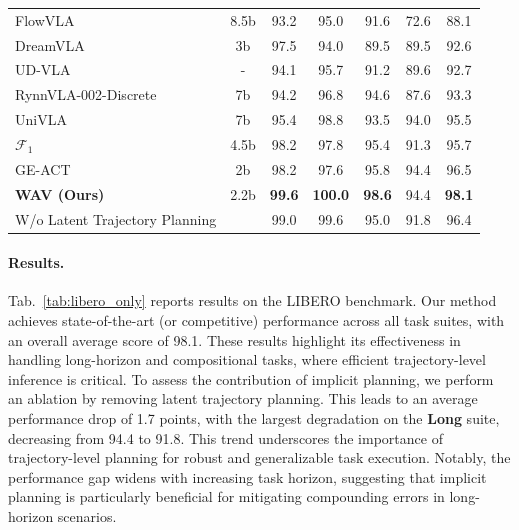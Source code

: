 \begin{table}[htbp]
{\begin{tabular}{lcccccc}
FlowVLA \citet{zhong2025flowvla} & 8.5b & 93.2 & 95.0 & 91.6 & 72.6 & 88.1 \\
DreamVLA \citet{zhang2025dreamvla} & 3b & 97.5 & 94.0 & 89.5 & 89.5 & 92.6 \\
UD-VLA \citet{chen2025unified} & - & 94.1 & 95.7 & 91.2 & 89.6 & 92.7 \\
RynnVLA-002-Discrete \citet{cen2025rynnvla} & 7b & 94.2 & 96.8 & 94.6 & 87.6 & 93.3 \\
UniVLA \citet{bu2025univla} & 7b & 95.4 & 98.8 & 93.5 & 94.0 & 95.5 \\
$\mathcal{F}_1$\citet{lv2025f1} & 4.5b & 98.2 & 97.8 & 95.4 & 91.3 & 95.7 \\
GE-ACT \citet{liao2025genie} & 2b & 98.2 & 97.6 & 95.8 & 94.4 & 96.5 \\
\midrule
\rowcolor{lightblue}
\textbf{WAV (Ours)} & 2.2b & \textbf{99.6} & \textbf{100.0} & \textbf{98.6} & 94.4 & \textbf{98.1} \\
\qquad W/o Latent Trajectory Planning &  & 99.0 & 99.6 & 95.0 & 91.8 & 96.4 \\
\bottomrule
\end{tabular}
}
\end{table}

\paragraph{Results.} 
Tab.~\ref{tab:libero_only} reports results on the LIBERO benchmark. 
Our method achieves state-of-the-art (or competitive) performance across all task suites, with an overall average score of 98.1. 
These results highlight its effectiveness in handling long-horizon and compositional tasks, where efficient trajectory-level inference is critical.
To assess the contribution of implicit planning, we perform an ablation by removing latent trajectory planning. 
This leads to an average performance drop of 1.7 points, with the largest degradation on the \textbf{Long} suite, decreasing from 94.4 to 91.8. 
This trend underscores the importance of trajectory-level planning for robust and generalizable task execution.
Notably, the performance gap widens with increasing task horizon, suggesting that implicit planning is particularly beneficial for mitigating compounding errors in long-horizon scenarios.


